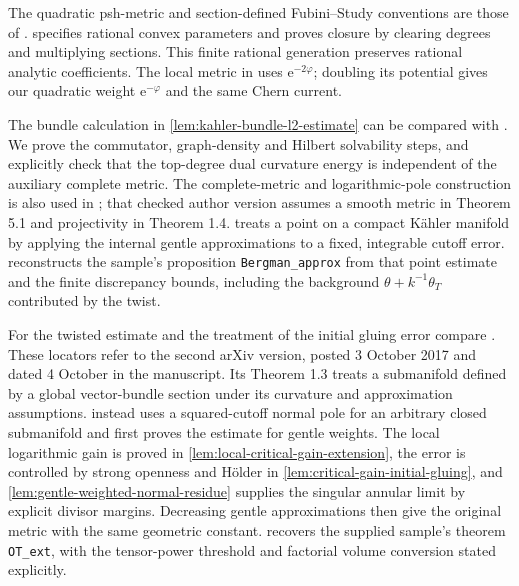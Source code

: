 The quadratic psh-metric and section-defined Fubini--Study conventions are those of \cite[Chapter on plurisubharmonic functions, definitions \texttt{Hermmetric}, \texttt{ArcFSmetric} and \texttt{gFSmetric}]{XiaSampleBook}.  specifies rational convex parameters and proves closure by clearing degrees and multiplying sections. This finite rational generation preserves rational analytic coefficients. The local metric in \cite[Section 2.4, pp.~49--50]{Bou04} uses $\mathrm e^{-2\varphi}$; doubling its potential gives our quadratic weight $\mathrm e^{-\varphi}$ and the same Chern current.

The bundle calculation in \cref{lem:kahler-bundle-l2-estimate} can be compared with \cite[Chapter VI, Section 6.1, pp.~304--306, and Chapter VII, Theorem 1.1, Theorem 1.2 and Corollary 1.3, pp.~329--330]{DemBook}. We prove the commutator, graph-density and Hilbert solvability steps, and explicitly check that the top-degree dual curvature energy is independent of the auxiliary complete metric. The complete-metric and logarithmic-pole construction is also used in \cite[Theorem 5.1 and its proof, pp.~18--22]{Hisamoto2012v2}; that checked author version assumes a smooth metric in Theorem 5.1 and projectivity in Theorem 1.4.  treats a point on a compact K\"ahler manifold by applying the internal gentle approximations to a fixed, integrable cutoff error.  reconstructs the sample's proposition \texttt{Bergman\_approx} from that point estimate and the finite discrepancy bounds, including the background $\theta+k^{-1}\theta_T$ contributed by the twist.

For the twisted estimate and the treatment of the initial gluing error compare \cite[Section 2, pp.~5--9, and Appendix, pp.~14--15]{Cao2017v2}. These locators refer to the second arXiv version, posted 3 October 2017 and dated 4 October in the manuscript. Its Theorem 1.3 treats a submanifold defined by a global vector-bundle section under its curvature and approximation assumptions.  instead uses a squared-cutoff normal pole for an arbitrary closed submanifold and first proves the estimate for gentle weights. The local logarithmic gain is proved in \cref{lem:local-critical-gain-extension}, the error is controlled by strong openness and H\"older in \cref{lem:critical-gain-initial-gluing}, and \cref{lem:gentle-weighted-normal-residue} supplies the singular annular limit by explicit divisor margins. Decreasing gentle approximations then give the original metric with the same geometric constant.  recovers the supplied sample's theorem \texttt{OT\_ext}, with the tensor-power threshold and factorial volume conversion stated explicitly.

